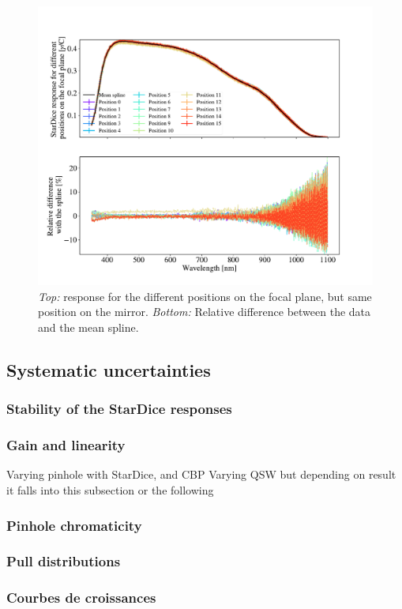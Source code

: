 \begin{figure}[h]
    \centering
    \includegraphics[width=\columnwidth]{fig/ccd_positions.pdf}
    \caption{\textit{Top:} \SD response for the different positions on the focal plane, but same position on the mirror. \textit{Bottom:} Relative difference between the data and the mean spline.}
    \label{fig:ccd_positions}
\end{figure}

\subsection{Systematic uncertainties}
\label{sec:systematics}

\subsubsection{Stability of the StarDice responses}

\subsubsection{Gain and linearity}
\label{sec:gain}

Varying pinhole with StarDice, and CBP
Varying QSW but depending on result it falls into this subsection or the following

\subsubsection{Pinhole chromaticity}

\subsubsection{Pull distributions}

\subsubsection{Courbes de croissances}






